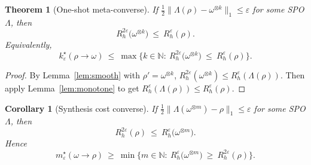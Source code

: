 \documentclass[11pt]{article}
\newtheorem{theorem}{Theorem}
\newtheorem{corollary}{Corollary}
\theoremstyle{definition}
\newcommand{\bbN}{\mathbb{N}}
\begin{document}
\begin{theorem}[One-shot meta-converse]\label{thm:meta}
If $\tfrac12\|\Lambda(\rho)-\omega^{\otimes k}\|_1\le \varepsilon$ for some SPO $\Lambda$, then
\begin{equation}\label{eq:meta}
R_h^{2\varepsilon}\!\big(\omega^{\otimes k}\big)\ \le\ R_h^{\varepsilon}(\rho).
\end{equation}
Equivalently,
\begin{equation}\label{eq:yield-implicit}
k_\varepsilon^\star(\rho\!\to\!\omega)\ \le\ \max\Big\{k\in\bbN:\ R_h^{2\varepsilon}\!\big(\omega^{\otimes k}\big)\ \le\ R_h^{\varepsilon}(\rho)\Big\}.
\end{equation}
\end{theorem}
\begin{proof}
By Lemma~\ref{lem:smooth} with $\rho'=\omega^{\otimes k}$,
$R_h^{2\varepsilon}(\omega^{\otimes k}) \le R_h^{\varepsilon}(\Lambda(\rho))$.
Then apply Lemma~\ref{lem:monotone} to get $R_h^{\varepsilon}(\Lambda(\rho)) \le R_h^{\varepsilon}(\rho)$.
\end{proof}

\begin{corollary}[Synthesis cost converse]\label{cor:synthesis}
If $\tfrac12\|\Lambda(\omega^{\otimes m})-\rho\|_1\le \varepsilon$ for some SPO $\Lambda$, then
\begin{equation}\label{eq:synth}
R_h^{2\varepsilon}(\rho)\ \le\ R_h^{\varepsilon}\!\big(\omega^{\otimes m}\big).
\end{equation}
Hence
\begin{equation}\label{eq:cost-implicit}
m_\varepsilon^\star(\omega\!\to\!\rho)\ \ge\ \min\Big\{m\in\bbN:\ R_h^{\varepsilon}\!\big(\omega^{\otimes m}\big)\ \ge\ R_h^{2\varepsilon}(\rho)\Big\}.
\end{equation}
\end{corollary}
\end{document}
